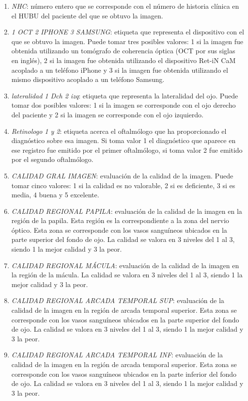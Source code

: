 \begin{enumerate}[itemsep=0.25em]
    \item \textit{NHC}: número entero que se corresponde con el número de historia clínica en el HUBU del paciente del que se obtuvo la imagen.
    \item \textit{1 OCT 2 IPHONE 3 SAMSUNG}: etiqueta que representa el dispositivo con el que se obtuvo la imagen. Puede tomar tres posibles valores: 1 si la imagen fue obtenida utilizando un tomógrafo de coherencia óptica (OCT por sus siglas en inglés), 2 si la imagen fue obtenida utilizando el dispositivo Ret-iN CaM acoplado a un teléfono iPhone y 3 si la imagen fue obtenida utilizando el mismo dispositivo acoplado a un teléfono Samsung.
    \item \textit{lateralidad 1 Dch 2 izq}: etiqueta que representa la lateralidad del ojo. Puede tomar dos posibles valores: 1 si la imagen se corresponde con el ojo derecho del paciente y 2 si la imagen se corresponde con el ojo izquierdo. 
    \item \textit{Retinologo 1 y 2}: etiqueta acerca el oftalmólogo que ha proporcionado el diagnóstico sobre esa imagen. Si toma valor 1 el diagnóstico que aparece en ese registro fue emitido por el primer oftalmólogo, si toma valor 2 fue emitido por el segundo oftalmólogo.
    \item \textit{CALIDAD GRAL IMAGEN}: evaluación de la calidad de la imagen. Puede tomar cinco valores: 1 si la calidad es no valorable, 2 si es deficiente, 3 si es media, 4 buena y 5 excelente.
    \item \textit{CALIDAD REGIONAL PAPILA}: evaluación de la calidad de la imagen en la región de la papila. Esta región es la correspondiente a la zona del nervio óptico. Esta zona se corresponde con los vasos sanguíneos ubicados en la parte superior del fondo de ojo. La calidad se valora en 3 niveles del 1 al 3, siendo 1 la mejor calidad y 3 la peor.
    \item \textit{CALIDAD REGIONAL MÁCULA}: evaluación de la calidad de la imagen en la región de la mácula. La calidad se valora en 3 niveles del 1 al 3, siendo 1 la mejor calidad y 3 la peor.
    \item \textit{CALIDAD REGIONAL ARCADA TEMPORAL SUP}: evaluación de la calidad de la imagen en la región de arcada temporal superior. Esta zona se corresponde con los vasos sanguíneos ubicados en la parte superior del fondo de ojo. La calidad se valora en 3 niveles del 1 al 3, siendo 1 la mejor calidad y 3 la peor.
    \item \textit{CALIDAD REGIONAL ARCADA TEMPORAL INF}: evaluación de la calidad de la imagen en la región de arcada temporal superior. Esta zona se corresponde con los vasos sanguíneos ubicados en la parte inferior del fondo de ojo. La calidad se valora en 3 niveles del 1 al 3, siendo 1 la mejor calidad y 3 la peor.

\end{enumerate}
